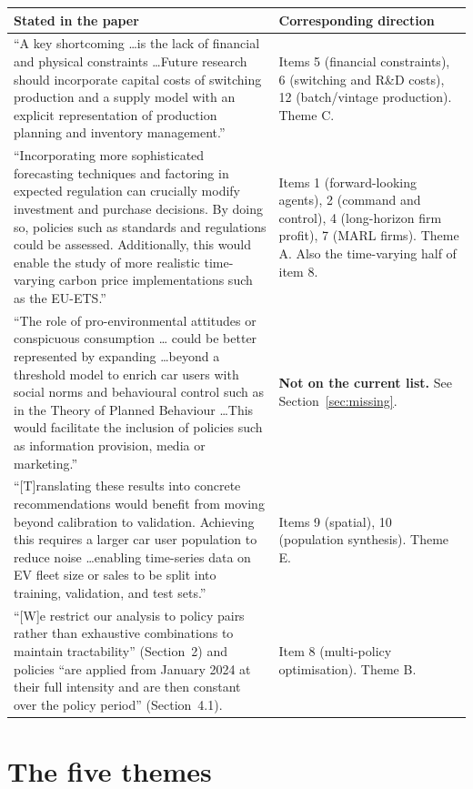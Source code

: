 \documentclass[11pt]{article}
\begin{document}
\begin{longtable}{@{}p{}p{}@{}}
\toprule
\textbf{Stated in the paper} & \textbf{Corresponding direction} \\
\midrule
\endhead
``A key shortcoming \dots is the lack of financial and physical
constraints \dots Future research should incorporate capital costs of
switching production and a supply model with an explicit representation of
production planning and inventory management.''
& Items 5 (financial constraints), 6 (switching and R\&D costs),
12 (batch/vintage production). Theme C. \\
\addlinespace
``Incorporating more sophisticated forecasting techniques and factoring in
expected regulation can crucially modify investment and purchase decisions.
By doing so, policies such as standards and regulations could be assessed.
Additionally, this would enable the study of more realistic time-varying
carbon price implementations such as the EU-ETS.''
& Items 1 (forward-looking agents), 2 (command and control), 4 (long-horizon
firm profit), 7 (MARL firms). Theme A. Also the time-varying half of
item 8. \\
\addlinespace
``The role of pro-environmental attitudes or conspicuous consumption \dots
could be better represented by expanding \dots beyond a threshold model to
enrich car users with social norms and behavioural control such as in the
Theory of Planned Behaviour \dots This would facilitate the inclusion of
policies such as information provision, media or marketing.''
& \textbf{Not on the current list.} See Section~\ref{sec:missing}. \\
\addlinespace
``[T]ranslating these results into concrete recommendations would benefit
from moving beyond calibration to validation. Achieving this requires a
larger car user population to reduce noise \dots enabling time-series data
on EV fleet size or sales to be split into training, validation, and test
sets.''
& Items 9 (spatial), 10 (population synthesis). Theme E. \\
\addlinespace
``[W]e restrict our analysis to policy pairs rather than exhaustive
combinations to maintain tractability'' (Section~2) and policies ``are
applied from January 2024 at their full intensity and are then constant
over the policy period'' (Section~4.1).
& Item 8 (multi-policy optimisation). Theme B. \\
\bottomrule
\end{longtable}

\section{The five themes}
\end{document}
